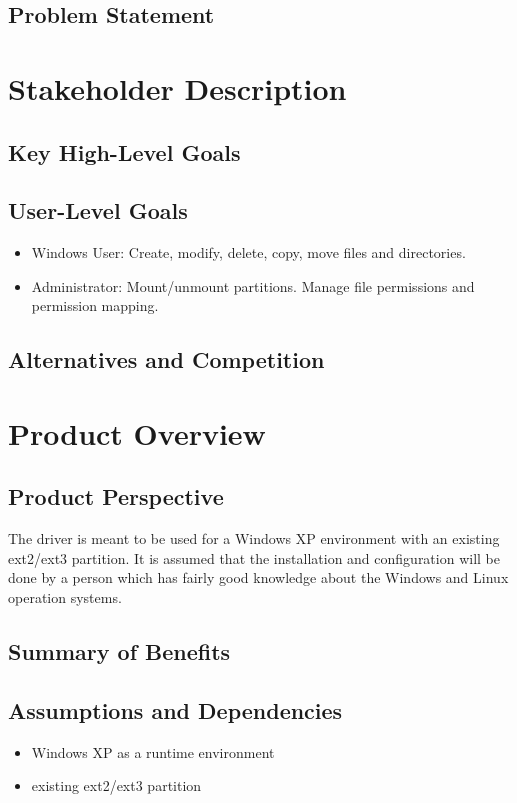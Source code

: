 \subsection{Problem Statement}

\section{Stakeholder Description}
\subsection{Key High-Level Goals}

\subsection{User-Level Goals}
\begin{itemize}
\item Windows User: Create, modify, delete, copy, move files and directories.
\item Administrator: Mount/unmount partitions. Manage file permissions and permission mapping.
\end{itemize}

\subsection{Alternatives and Competition}

\section{Product Overview}
\subsection{Product Perspective}
The driver is meant to be used for a Windows XP environment with an existing ext2/ext3 partition. It is assumed that the installation and configuration will be done by a person which has fairly good knowledge about the Windows and Linux operation systems.

\subsection{Summary of Benefits}

\subsection{Assumptions and Dependencies}
\begin{itemize}
  \item Windows XP as a runtime environment
  \item existing ext2/ext3 partition
\end{itemize}

